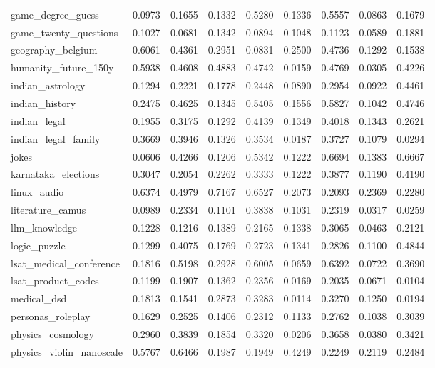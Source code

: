 \documentclass[pdflatex,sn-mathphys-num]{sn-jnl}%
\theoremstyle{thmstyleone}%
\theoremstyle{thmstyletwo}%
\theoremstyle{thmstylethree}%
\begin{document}
\begin{appendices}
\begin{landscape}
\begin{longtable}{@{}p{3.8cm}cccccccc@{}}
game\_degree\_guess & 0.0973 & 0.1655 & 0.1332 & 0.5280 & 0.1336 & 0.5557 & 0.0863 & 0.1679 \\
game\_twenty\_questions & 0.1027 & 0.0681 & 0.1342 & 0.0894 & 0.1048 & 0.1123 & 0.0589 & 0.1881 \\
geography\_belgium & 0.6061 & 0.4361 & 0.2951 & 0.0831 & 0.2500 & 0.4736 & 0.1292 & 0.1538 \\
humanity\_future\_150y & 0.5938 & 0.4608 & 0.4883 & 0.4742 & 0.0159 & 0.4769 & 0.0305 & 0.4226 \\
indian\_astrology & 0.1294 & 0.2221 & 0.1778 & 0.2448 & 0.0890 & 0.2954 & 0.0922 & 0.4461 \\
indian\_history & 0.2475 & 0.4625 & 0.1345 & 0.5405 & 0.1556 & 0.5827 & 0.1042 & 0.4746 \\
indian\_legal & 0.1955 & 0.3175 & 0.1292 & 0.4139 & 0.1349 & 0.4018 & 0.1343 & 0.2621 \\
indian\_legal\_family & 0.3669 & 0.3946 & 0.1326 & 0.3534 & 0.0187 & 0.3727 & 0.1079 & 0.0294 \\
jokes & 0.0606 & 0.4266 & 0.1206 & 0.5342 & 0.1222 & 0.6694 & 0.1383 & 0.6667 \\
karnataka\_elections & 0.3047 & 0.2054 & 0.2262 & 0.3333 & 0.1222 & 0.3877 & 0.1190 & 0.4190 \\
linux\_audio & 0.6374 & 0.4979 & 0.7167 & 0.6527 & 0.2073 & 0.2093 & 0.2369 & 0.2280 \\
literature\_camus & 0.0989 & 0.2334 & 0.1101 & 0.3838 & 0.1031 & 0.2319 & 0.0317 & 0.0259 \\
llm\_knowledge & 0.1228 & 0.1216 & 0.1389 & 0.2165 & 0.1338 & 0.3065 & 0.0463 & 0.2121 \\
logic\_puzzle & 0.1299 & 0.4075 & 0.1769 & 0.2723 & 0.1341 & 0.2826 & 0.1100 & 0.4844 \\
lsat\_medical\_conference & 0.1816 & 0.5198 & 0.2928 & 0.6005 & 0.0659 & 0.6392 & 0.0722 & 0.3690 \\
lsat\_product\_codes & 0.1199 & 0.1907 & 0.1362 & 0.2356 & 0.0169 & 0.2035 & 0.0671 & 0.0104 \\
medical\_dsd & 0.1813 & 0.1541 & 0.2873 & 0.3283 & 0.0114 & 0.3270 & 0.1250 & 0.0194 \\
personas\_roleplay & 0.1629 & 0.2525 & 0.1406 & 0.2312 & 0.1133 & 0.2762 & 0.1038 & 0.3039 \\
physics\_cosmology & 0.2960 & 0.3839 & 0.1854 & 0.3320 & 0.0206 & 0.3658 & 0.0380 & 0.3421 \\
physics\_violin\_nanoscale & 0.5767 & 0.6466 & 0.1987 & 0.1949 & 0.4249 & 0.2249 & 0.2119 & 0.2484 \\

\end{longtable}
\end{landscape}
\end{appendices}
\end{document}
